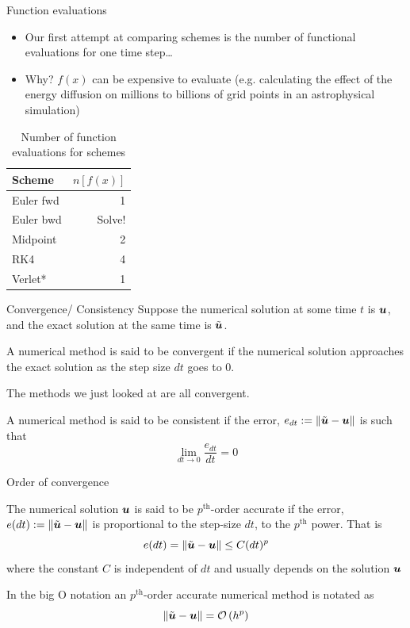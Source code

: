 \documentclass[presentation]{beamer}
\newcommand{\gv}[1]{\ensuremath{\mbox{\boldmath$ #1 $}}}
\newcommand{\order}[1]{\mathcal O \left( #1 \right)} %
\begin{document}
\begin{frame}[label={sec:orgfe7f848}]{Function evaluations}
\begin{itemize}
\item Our first attempt at comparing schemes is the number of functional
evaluations for one time step\ldots{}
\item Why? \(f(x)\) can be expensive to evaluate (e.g. calculating the effect
of the energy diffusion on millions to billions of
grid points in an astrophysical simulation)
\end{itemize}
\begin{table}[htbp]
\caption{\label{tab_sym_snake_params}
Number of function evaluations for schemes}
\centering
\begin{tabular}{lr}
\toprule
Scheme & \(n[f(x)]\)\\
\midrule
Euler fwd & 1\\
Euler bwd & Solve!\\
Midpoint & 2\\
RK4 & 4\\
Verlet* & 1\\
\bottomrule
\end{tabular}
\end{table}
\end{frame}
\begin{frame}[label={sec:org2f35bb0}]{Convergence/ Consistency}
Suppose the numerical solution at some time \(t\) is \(\gv{u}\), and the
exact solution at the same time is \(\tilde{\gv{u}}\).
\begin{definition}[Convergence]
A numerical method is said to be convergent if the numerical solution
approaches the exact solution as the step size \(dt\) goes to 0.
\end{definition}
The methods we just looked at are all convergent.
\begin{definition}[Consistency]
A numerical method is said to be consistent if the error, \(e_{dt}:=\lVert\tilde{\gv{u}}-\gv{u} \rVert\) is such that
\[ \lim_{dt \to 0} \frac{e_{dt}}{dt} = 0\]
\end{definition}
\end{frame}
\begin{frame}[label={sec:orgfca2a25}]{Order of convergence}
\begin{definition}
The numerical solution \(\gv{u}\) is said to be \(p^{\text{th}}\)-order
accurate if the error, \(e(dt):=\lVert\tilde{\gv{u}}-\gv{u} \rVert\)
is proportional to the step-size \(dt\), to the \(p^{\text{th}}\) power. That
is
\[ e(dt)=\lVert\tilde{\gv{u}}-\gv{u} \rVert\leq C(dt)^{p} \]
where the constant \(C\) is independent of \(dt\) and usually depends on
the solution \(\gv{u}\)
\end{definition}
 In the big O notation an \(p^{\text{th}}\)-order accurate numerical method
 is notated as
\[ \lVert\tilde{\gv{u}}-\gv{u} \rVert = \order{h^p}\]
\end{frame}
\end{document}
